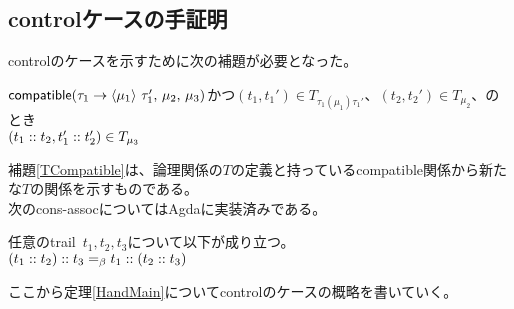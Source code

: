 \subsection{controlケースの手証明}
controlのケースを示すために次の補題が必要となった。
\begin{lemma}
  $\Compatible{\Trail{\tau_1}{\tau_1'}{\mu_1}}{\mu_2}{\mu_3}$かつ$(t_1, t_1')\in T_{\tau_1(\mu_1)\tau_1'}、(t_2, t_2')\in T_{\mu_2}、$のとき\\
  $(\Cons{t_1}{t_2}, \Cons{t_1'}{t_2'})\in T_{\mu_3}$
\label{TCompatible}
\end{lemma}
補題\ref{TCompatible}は、論理関係の$T$の定義と持っている\textsf{compatible}関係から新たな$T$の関係を示すものである。\\
次の\textsf{cons-assoc}についてはAgdaに実装済みである。
\begin{lemma}
  任意のtrail\ $t_1,t_2,t_3$について以下が成り立つ。\\
  $\Cons{\ConsP{t_1}{t_2}}{t_3} =_{\beta} \Cons{t_1}{\ConsP{t_2}{t_3}}$
\label{ConsAssoc}
\end{lemma}
ここから定理\ref{HandMain}についてcontrolのケースの概略を書いていく。\\

